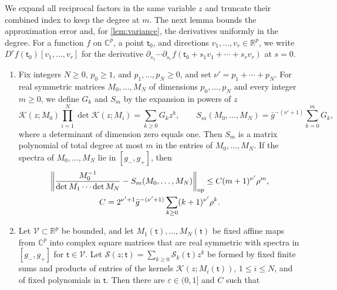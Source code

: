 We expand all reciprocal factors in the same variable $z$ and truncate
their combined index to keep the degree at $m$. The next lemma bounds
the approximation error and, for \cref{lem:variance}, the derivatives
uniformly in the degree. For a function $f$ on
$\mathbb C^p$, a point $\mathsf t_0$, and directions
$v_1,\ldots,v_r\in\mathbb R^p$, we write
$D^rf(\mathsf t_0)[v_1,\ldots,v_r]$ for the derivative
$\partial_{s_1}\cdots\partial_{s_r}f(\mathsf t_0+s_1v_1+\cdots+s_rv_r)$ at
$s=0$.

\begin{lemma}
\label{lem:matrix-approximation}\label{lem:reciprocal-bounds}
\begin{enumerate}[label=(\alph*)]
\item Fix integers $N\ge0$, $p_0\ge1$, and $p_1,\ldots,p_N\ge0$, and set
 $\nu'=p_1+\cdots+p_N$. For real symmetric matrices $M_0,\ldots,M_N$ of
 dimensions $p_0,\ldots,p_N$ and every integer $m\ge0$, we define $G_k$
 and $S_m$ by the expansion in powers of $z$
 \begin{equation}\label{eq:matrix-polynomial}
  \mathcal K(z;M_0)\prod_{i=1}^N\det\mathcal K(z;M_i)
  =\sum_{k\ge0}G_kz^k,\qquad
  S_m(M_0,\ldots,M_N)=\bar g^{-(\nu'+1)}\sum_{k=0}^mG_k,
 \end{equation}
 where a determinant of dimension zero equals one. Then $S_m$ is a matrix
 polynomial of total degree at most $m$ in the entries of
 $M_0,\ldots,M_N$. If the spectra of $M_0,\ldots,M_N$ lie in
 $[g_-,g_+]$, then
 \begin{equation}\label{eq:matrix-approximation-error}
  \begin{gathered}
  \left\|\frac{M_0^{-1}}{\det M_1\cdots\det M_N}
        -S_m(M_0,\ldots,M_N)\right\|_{\rm op}
  \le C(m+1)^{\nu'}\rho^m,\\
  C=2^{\nu'+1}\bar g^{-(\nu'+1)}\sum_{k\ge0}(k+1)^{\nu'}\rho^k.
  \end{gathered}
 \end{equation}
\item Let $\mathcal V\subset\mathbb R^p$ be bounded, and let
 $M_1(\mathsf t),\ldots,M_N(\mathsf t)$ be fixed affine maps from
 $\mathbb C^p$ into complex square matrices that are real symmetric with
 spectra in $[g_-,g_+]$ for $\mathsf t\in\mathcal V$. Let
 $\mathcal S(z;\mathsf t)=\sum_{k\ge0}\mathcal S_k(\mathsf t)z^k$ be formed
 by fixed finite sums and products of entries of the kernels
 $\mathcal K(z;M_i(\mathsf t))$, $1\le i\le N$, and of fixed polynomials
 in $\mathsf t$. Then there are
 $\varepsilon\in(0,1]$ and $C$ such that

\end{enumerate}
\end{lemma}

